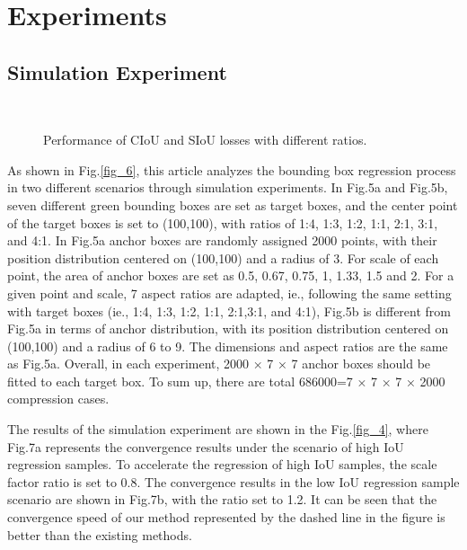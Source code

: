 \documentclass[lettersize,journal]{IEEEtran}
\begin{document}
	\section{Experiments}
	\subsection{Simulation Experiment}
		\begin{figure*} [t!]
		\hspace{.15in}
		\hspace{.15in}
		\hspace{.15in}
		\\
		\hspace{.15in}
		\hspace{.15in}
		\caption{Performance of CIoU and SIoU losses with different ratios.} 
		\label{fig_7} 
	\end{figure*}
	\par As shown in Fig.\ref{fig_6}, this article analyzes the bounding box regression process in two different scenarios through simulation experiments. In Fig.5a and Fig.5b, seven different green bounding boxes are set as target boxes, and the center point of the target boxes is set to (100,100), with ratios of 1:4, 1:3, 1:2, 1:1, 2:1, 3:1, and 4:1. In Fig.5a anchor boxes are randomly assigned 2000 points, with their position distribution centered on (100,100) and a radius of 3. For scale of each point, the area of anchor boxes are set as 0.5, 0.67, 0.75, 1, 1.33, 1.5 and 2. For a given point and scale, 7 aspect ratios are adapted, ie., following the same setting with target boxes (ie., 1:4, 1:3, 1:2, 1:1, 2:1,3:1, and 4:1), Fig.5b is different from Fig.5a in terms of anchor distribution, with its position distribution centered on (100,100) and a radius of 6 to 9. The dimensions and aspect ratios are the same as Fig.5a. Overall, in each experiment, 2000 × 7 × 7 anchor boxes should be fitted to each target box. To sum up, there are total 686000=7 × 7 × 7 × 2000 compression cases.
	\par The results of the simulation experiment are shown in the Fig.\ref{fig_4}, where Fig.7a represents the convergence results under the scenario of high IoU regression samples. To accelerate the regression of high IoU samples, the scale factor ratio is set to 0.8. The convergence results in the low IoU regression sample scenario are shown in Fig.7b, with the ratio set to 1.2. It can be seen that the convergence speed of our method represented by the dashed line in the figure is better than the existing methods.
\end{document}
